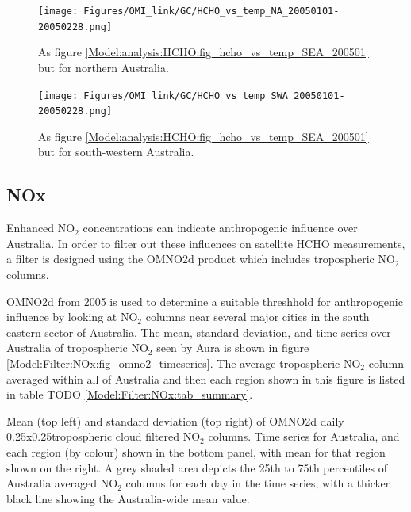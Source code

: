         \begin{figure}
          \texttt{[image: Figures/OMI\_link/GC/HCHO\_vs\_temp\_NA\_20050101-20050228.png]}
          \caption{%
            As figure \ref{Model:analysis:HCHO:fig_hcho_vs_temp_SEA_200501} but for northern Australia.
            }
          \label{Model:analysis:HCHO:fig_hcho_vs_temp_NA_200501}
        \end{figure}
          
        \begin{figure}
          \texttt{[image: Figures/OMI\_link/GC/HCHO\_vs\_temp\_SWA\_20050101-20050228.png]}
          \caption{%
            As figure \ref{Model:analysis:HCHO:fig_hcho_vs_temp_SEA_200501} but for south-western Australia.
            }
          \label{Model:analysis:HCHO:fig_hcho_vs_temp_SWA_200501}
        \end{figure}
  
  \subsection{NOx}
    \label{Model:Filter:NOx}
    
    Enhanced NO$_2$ concentrations can indicate anthropogenic influence over Australia.
    In order to filter out these influences on satellite HCHO measurements, a filter is designed using the OMNO2d product which includes tropospheric NO$_2$ columns.
    
    OMNO2d from 2005 is used to determine a suitable threshhold for anthropogenic influence by looking at NO$_2$ columns near several major cities in the south eastern sector of Australia.
    The mean, standard deviation, and time series over Australia of tropospheric NO$_2$ seen by Aura is shown in figure \ref{Model:Filter:NOx:fig_omno2_timeseries}.
    The average tropospheric NO$_2$ column averaged within all of Australia and then each region shown in this figure is listed in table TODO \ref{Model:Filter:NOx:tab_summary}.
    
    {Mean (top left) and standard deviation (top right) of OMNO2d daily 0.25x0.25\degr tropospheric cloud filtered NO$_2$ columns. Time series for Australia, and each region (by colour) shown in the bottom panel, with mean for that region shown on the right. A grey shaded area depicts the 25th to 75th percentiles of Australia averaged NO$_2$ columns for each day in the time series, with a thicker black line showing the Australia-wide mean value.}
    {\label{Model:Filter:NOx:fig_omno2_timeseries}}
    
